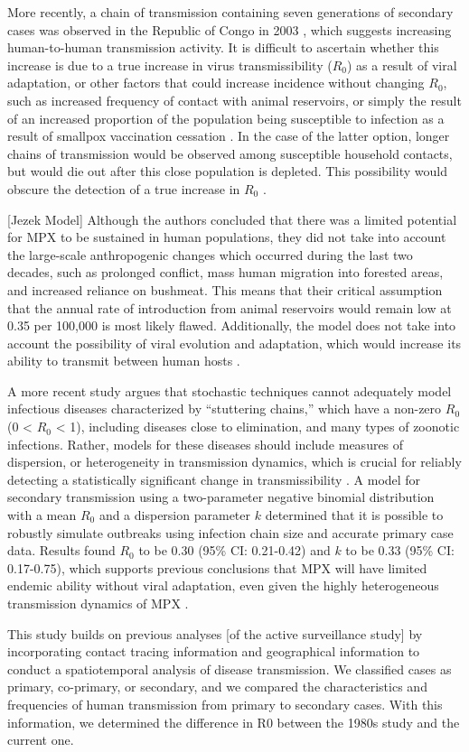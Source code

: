 More recently, a chain of transmission containing seven generations of secondary cases was observed in the Republic of Congo in 2003 \cite{Learned2005}, which suggests increasing human-to-human transmission activity. It is difficult to ascertain whether this increase is due to a true increase in virus transmissibility ($R_{0}$) as a result of viral adaptation, or other factors that could increase incidence without changing $R_{0}$, such as increased frequency of contact with animal reservoirs, or simply the result of an increased proportion of the population being susceptible to infection as a result of smallpox vaccination cessation \cite{Blumberg2014, DiGiulio2004}. In the case of the latter option, longer chains of transmission would be observed among susceptible household contacts, but would die out after this close population is depleted. This possibility would obscure the detection of a true increase in $R_{0}$ \cite{Blumberg2014}.

[Jezek Model] Although the authors concluded that there was a limited potential for MPX to be sustained in human populations, they did not take into account the large-scale anthropogenic changes which occurred during the last two decades, such as prolonged conflict, mass human migration into forested areas, and increased reliance on bushmeat. This means that their critical assumption that the annual rate of introduction from animal reservoirs would remain low at 0.35 per 100,000 is most likely flawed. Additionally, the model does not take into account the possibility of viral evolution and adaptation, which would increase its ability to transmit between human hosts \cite{Kugelman2014}.

A more recent study argues that stochastic techniques cannot adequately model infectious diseases characterized by “stuttering chains,” which have a non-zero $R_{0}$ (0 < $R_{0}$ < 1), including diseases close to elimination, and many types of zoonotic infections. Rather, models for these diseases should include measures of dispersion, or heterogeneity in transmission dynamics, which is crucial for reliably detecting a statistically significant change in transmissibility \cite{Blumberg2013}. A model for secondary transmission using a two-parameter negative binomial distribution with a mean $R_{0}$ and a dispersion parameter $k$ determined that it is possible to robustly simulate outbreaks using infection chain size and accurate primary case data. Results found $R_{0}$ to be 0.30 (95\% CI: 0.21-0.42) and $k$ to be 0.33 (95\% CI: 0.17-0.75), which supports previous conclusions that MPX will have limited endemic ability without viral adaptation, even given the highly heterogeneous transmission dynamics of MPX \cite{Blumberg2013}.

This study builds on previous analyses [of the active surveillance study] by incorporating contact tracing information and geographical information to conduct a spatiotemporal analysis of disease transmission. We classified cases as primary, co-primary, or secondary, and we compared the characteristics and frequencies of human transmission from primary to secondary cases. With this information, we determined the difference in R0 between the 1980s study and the current one. 

